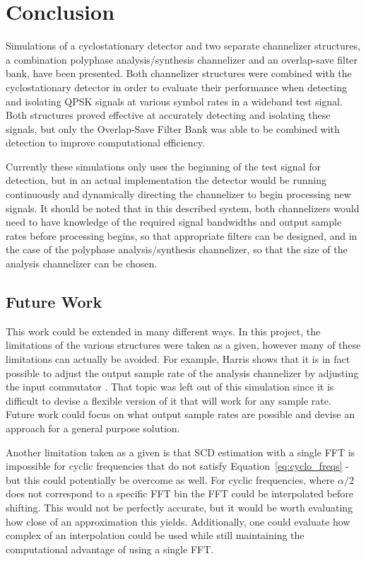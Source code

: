 \documentclass[12pt]{article}
\begin{document}
\section{Conclusion}
\label{sec:conclusion}
Simulations of a cyclostationary detector and two separate channelizer
structures, a combination polyphase analysis/synthesis channelizer and an
overlap-save filter bank, have been presented. Both channelizer structures
were combined with the cyclostationary detector in order to evaluate their
performance when detecting and isolating QPSK signals at various symbol rates
in a wideband test signal. Both structures proved effective at accurately
detecting and isolating these signals, but only the Overlap-Save Filter Bank
was able to be combined with detection to improve computational efficiency.

Currently these simulations only uses the beginning of the test signal for
detection, but in an actual implementation the detector would be running
continuously and dynamically directing the channelizer to begin processing new
signals. It should be noted that in this described system, both channelizers would
need to have knowledge of the required signal bandwidths and output sample
rates before processing begins, so that appropriate filters can be designed, and
in the case of the polyphase analysis/synthesis channelizer, so that the size
of the analysis channelizer can be chosen.

\subsection{Future Work}
This work could be extended in many different ways. In this project, the
limitations of the various structures were taken as a given, however many of
these limitations can actually be avoided. For example, Harris shows that it is
in fact possible to adjust the output sample rate of the analysis channelizer
by adjusting the input commutator \cite{Harris1}. That topic was left out of this
simulation since it is difficult to devise a flexible version of it that will
work for any sample rate. Future work could focus on what output sample rates
are possible and devise an approach for a general purpose solution.

Another limitation taken as a given is that SCD estimation with a single FFT is
impossible for cyclic frequencies that do not satisfy
Equation~\ref{eq:cyclo_freqs} - but this could potentially be overcome as well.
For cyclic frequencies, where $\alpha/2$ does not correspond to a specific FFT
bin the FFT could be interpolated before shifting. This would not be perfectly
accurate, but it would be worth evaluating how close of an approximation this
yields. Additionally, one could evaluate how complex of an interpolation could
be used while still maintaining the computational advantage of using a single FFT.
\end{document}
